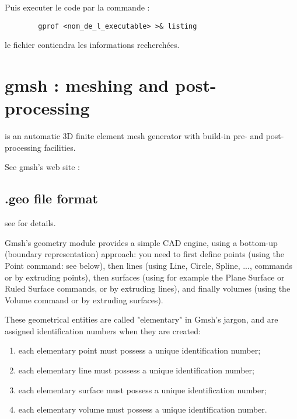 Puis executer le code par la commande :
\begin{verbatim}
        gprof <nom_de_l_executable> >& listing
\end{verbatim}
le fichier  contiendra les informations recherch\'ees.





\section{gmsh  : meshing and post-processing}\label{gmsh}


 is an automatic 3D finite element mesh generator with
build-in pre- and post-processing facilities.

See gmsh's web site : 


\subsection{.geo file format} \label{gmsh_geo}

see  for details.



Gmsh's geometry module provides a simple CAD engine, using a bottom-up (boundary representation) approach: you need to first define points (using the Point command: see below), then lines (using Line, Circle, Spline, ..., commands or by extruding points), then surfaces (using for example the Plane Surface or Ruled Surface commands, or by extruding lines), and finally volumes (using the Volume command or by extruding surfaces).

These geometrical entities are called "elementary" in Gmsh's jargon, and are assigned identification numbers when they are created:

\begin{enumerate}
  \item  each elementary point must possess a unique identification number;
  \item  each elementary line must possess a unique identification number;
  \item  each elementary surface must possess a unique identification number;
  \item  each elementary volume must possess a unique identification number. 
\end{enumerate}

